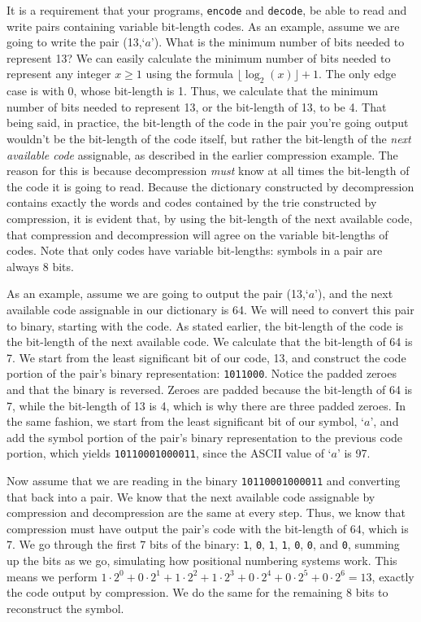 \documentclass{article}
\begin{document}
It is a requirement that your programs, \texttt{encode} and \texttt{decode},
be able to read and write pairs containing variable bit-length codes. As an
example, assume we are going to write the pair (13,\;`$a$'). What is the minimum
number of bits needed to represent 13? We can easily calculate the minimum
number of bits needed to represent any integer $x \geq 1$ using the formula
$\lfloor \log_2 (x) \rfloor + 1$. The only edge case is with 0, whose bit-length
is 1. Thus, we calculate that the minimum number of bits needed to represent 13,
or the bit-length of 13, to be 4. That being said, in practice, the bit-length of
the code in the pair you're going output wouldn't be the bit-length of the code
itself, but rather the bit-length of the \emph{next available code} assignable, as
described in the earlier compression example. The reason for this is because
decompression \emph{must} know at all times the bit-length of the code it is going
to read. Because the dictionary constructed by decompression contains exactly
the words and codes contained by the trie constructed by compression, it is
evident that, by using the bit-length of the next available code, that compression
and decompression will agree on the variable bit-lengths of codes. Note that only
codes have variable bit-lengths: symbols in a pair are always 8 bits.

As an example, assume we are going to output the pair (13,\;`$a$'), and the next
available code assignable in our dictionary is 64. We will need to convert this
pair to binary, starting with the code. As stated earlier, the bit-length of the
code is the bit-length of the next available code. We calculate that the bit-length
of 64 is 7. We start from the least significant bit of our code, 13, and
construct the code portion of the pair's binary representation:
\texttt{1011000}. Notice the padded zeroes and that the binary is reversed.
Zeroes are padded because the bit-length of 64 is 7, while the bit-length of 13 is
4, which is why there are three padded zeroes. In the same fashion, we start
from the least significant bit of our symbol, `$a$', and add the symbol portion
of the pair's binary representation to the previous code portion, which yields
\texttt{10110001000011}, since the ASCII value of `$a$' is 97.

Now assume that we are reading in the binary \texttt{10110001000011} and
converting that back into a pair. We know that the next available code
assignable by compression and decompression are the same at every step. Thus, we
know that compression must have output the pair's code with the bit-length of 64,
which is 7. We go through the first 7 bits of the binary: \texttt{1},
\texttt{0}, \texttt{1}, \texttt{1}, \texttt{0}, \texttt{0}, and \texttt{0},
summing up the bits as we go, simulating how positional numbering systems work.
This means we perform $1 \cdot 2^0 + 0 \cdot 2^1 + 1 \cdot 2^2 + 1 \cdot 2^3 +
0 \cdot 2^4 + 0 \cdot 2^5 + 0 \cdot 2^6 = 13$, exactly the code output by
compression. We do the same for the remaining 8 bits to reconstruct the symbol.
\end{document}
